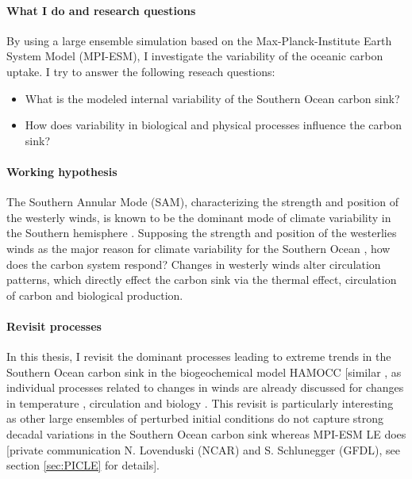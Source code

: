 \documentclass[12pt]{article}
\begin{document}
\paragraph{What I do and research questions}
By using a large ensemble simulation based on the Max-Planck-Institute Earth System Model (MPI-ESM), I investigate the variability of the oceanic carbon uptake. I try to answer the following reseach questions: 
\begin{itemize}
\item What is the modeled internal variability of the Southern Ocean carbon sink? 
\item How does variability in biological and physical processes influence the carbon sink?
\end{itemize} 


 
 
\paragraph{Working hypothesis}
The Southern Annular Mode (SAM), characterizing the strength and position of the westerly winds, is known to be the dominant mode of climate variability in the Southern hemisphere \citep{Thompson2000,Thompson2011}.  Supposing the strength and position of the westerlies winds as the major reason for climate variability for the Southern Ocean \citep{Thompson2000}, how does the carbon system respond? Changes in westerly winds alter circulation patterns, which directly effect the carbon sink via the thermal effect, circulation of carbon and biological production.

\paragraph{Revisit processes}
In this thesis, I revisit the dominant processes leading to extreme trends in the Southern Ocean carbon sink in the biogeochemical model HAMOCC [similar \cite{Lovenduski2007,Lovenduski2008}, as individual processes related to changes in winds are already discussed for changes in temperature \citep{Takahashi1993,Lovenduski2007}, circulation \citep{Abernathey2011,Hauck2013,Lauderdale2016,Lovenduski2008} and biology \citep{Lovenduski2005,Tagliabue2014,wang2012}. This revisit is particularly interesting as other large ensembles of perturbed initial conditions do not capture strong decadal variations in the Southern Ocean carbon sink whereas MPI-ESM LE does [private communication N. Lovenduski (NCAR) and S. Schlunegger (GFDL), see section \ref{sec:PICLE} for details].
\end{document}
